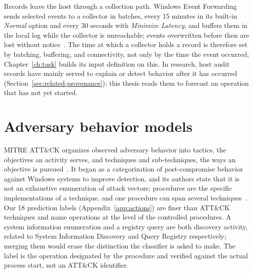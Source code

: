 Records leave the host through a collection path. Windows Event
Forwarding sends selected events to a collector in batches, every 15
minutes in its built-in \emph{Normal} option and every 30 seconds with
\emph{Minimize Latency}, and buffers them in the local log while the
collector is unreachable; events overwritten before then are lost
without notice~\cite{mswef}.
The time at which a collector holds a record is therefore set by
batching, buffering, and connectivity, not only by the time the event
occurred; Chapter~\ref{ch:task} builds its input definition on this.
In research, host audit records have mainly served to explain or
detect behavior after it has occurred
(Section~\ref{sec:related-provenance}); this thesis reads them to
forecast an operation that has not yet started.

\section{Adversary behavior models}
\label{sec:related-attack}

MITRE ATT\&CK organizes observed adversary behavior into tactics, the
objectives an activity serves, and techniques and sub-techniques, the
ways an objective is pursued~\cite{mitreintro,mitrewindows}. It began
as a categorization of post-compromise behavior against Windows
systems to improve detection, and its authors state that it is not an
exhaustive enumeration of attack vectors; procedures are the specific
implementations of a technique, and one procedure can span several
techniques~\cite{strom2018mitre}.
Our 18 prediction labels (Appendix~\ref{app:actions}) are finer than
ATT\&CK techniques and name operations at the level of the controlled
procedures. A system information enumeration and a registry query are
both discovery activity, related to System Information Discovery and
Query Registry respectively; merging them would erase the distinction
the classifier is asked to make. The label is the operation designated
by the procedure and verified against the actual process start, not an
ATT\&CK identifier.

